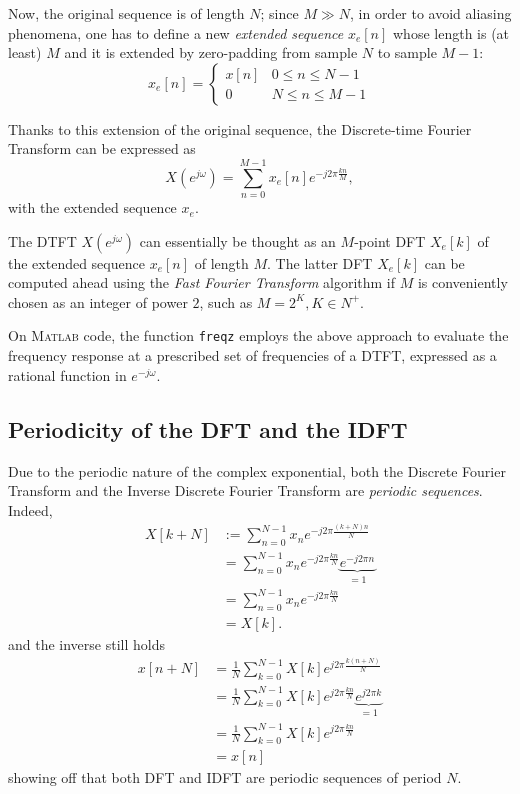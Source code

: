 \documentclass[\documentfontsize, twocolumn]{\classname}
\begin{document}
Now, the original sequence is of length $N$; since $M\gg N$, in order to avoid aliasing phenomena, one has to define a new \emph{extended sequence} $x_e[n]$ whose length is (at least) $M$ and it is extended by zero-padding from sample $N$ to sample $M-1$:
\[
    x_e[n] =
\left\{
    \begin{array}{ll}
        x[n] & 0 \leq n \leq N-1\\
        0 & N \leq n \leq M-1
    \end{array}
\right.
\]

Thanks to this extension of the original sequence, the Discrete-time Fourier Transform can be expressed as
\[
    X(e^{j\omega}) = \sum_{n=0}^{M-1} x_e[n] e^{-j2\pi \frac{kn}{M}},
\]
with the extended sequence $x_e$.

The DTFT $X(e^{j\omega})$ can essentially be thought as an $M$-point DFT $X_e[k]$ of the extended sequence $x_e[n]$ of length $M$. The latter DFT $X_e[k]$ can be computed ahead using the \emph{Fast Fourier Transform} algorithm if $M$ is conveniently chosen as an integer of power $2$, such as $M = 2^K, K \in N^+$.

On \textsc{Matlab} code, the function \texttt{freqz} employs the above approach to evaluate the frequency response at a prescribed set of frequencies of a DTFT, expressed as a rational function in $e^{-j\omega}$.

\subsection{Periodicity of the DFT and the IDFT}

Due to the periodic nature of the complex exponential, both the Discrete Fourier Transform and the Inverse Discrete Fourier Transform are \emph{periodic sequences}. Indeed,
\begin{align*}
    X[k+N]
    &:= \sum_{n=0}^{N-1} x_n e^{-j2\pi\frac{(k+N)n}{N}} \\
    &= \sum_{n=0}^{N-1} x_n e^{-j2\pi\frac{kn}{N}}\underbrace{e^{-j2\pi n}}_{=1} \\
    &= \sum_{n=0}^{N-1} x_n e^{-j2\pi\frac{kn}{N}}\\
    &= X[k].
\end{align*}
and the inverse still holds
\begin{align*}
    x[n+N]
    &= \frac 1 N \sum_{k=0}^{N-1}X[k] e^{j2\pi \frac{k(n+N)}{N}}\\
    &= \frac 1 N \sum_{k=0}^{N-1}X[k] e^{j2\pi \frac{kn}{N}}\underbrace{e^{j2\pi k}}_{=1}\\
    &= \frac 1 N \sum_{k=0}^{N-1}X[k] e^{j2\pi \frac{kn}{N}}\\
    &= x[n]
\end{align*}
showing off that both DFT and IDFT are periodic sequences of period $N$.
\end{document}
